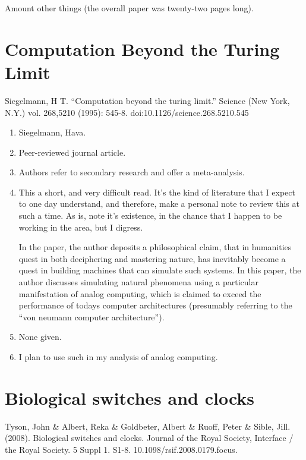 Amount other things (the overall paper was twenty-two pages long).


\section*{Computation Beyond the Turing Limit}

Siegelmann, H T. “Computation beyond the turing limit.” Science (New York, N.Y.) vol. 268,5210 (1995): 545-8. doi:10.1126/science.268.5210.545

\begin{enumerate}
    \item Siegelmann, Hava.
    \item Peer-reviewed journal article.
    \item Authors refer to secondary research and offer a meta-analysis.
    \item This a short, and very difficult read. It's the kind of literature that I expect to one day understand, and therefore, make a personal note to review this at such a time. As is, note it's existence, in the chance that I happen to be working in the area, but I digress.
    
    In the paper, the author deposits a philosophical claim, that in humanities quest in both deciphering and mastering nature, has inevitably become a quest in building machines that can simulate such systems. In this paper, the author discusses simulating natural phenomena using a particular manifestation of analog computing, which is claimed to exceed the performance of todays computer architectures (presumably referring to the ``von neumann computer architecture''). 
    \item None given. 
    \item I plan to use such in my analysis of analog computing. 
\end{enumerate}



\section*{Biological switches and clocks}

Tyson, John \& Albert, Reka \& Goldbeter, Albert \& Ruoff, Peter \& Sible, Jill. (2008). Biological switches and clocks. Journal of the Royal Society, Interface / the Royal Society. 5 Suppl 1. S1-8. 10.1098/rsif.2008.0179.focus. 

